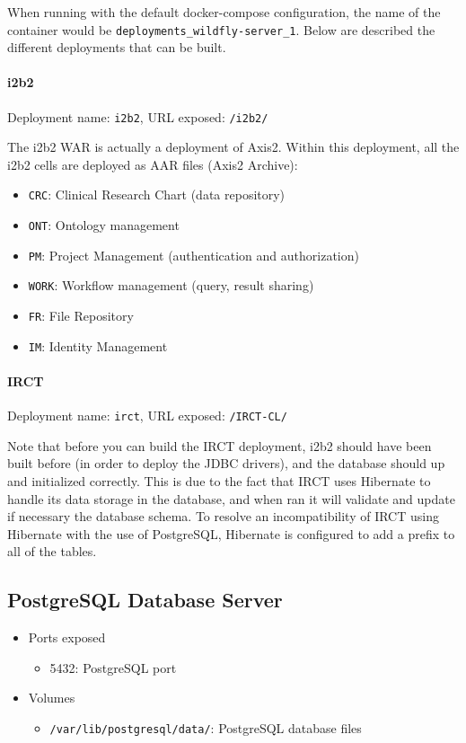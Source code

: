 When running with the default docker-compose configuration, the name of the container would be \verb|deployments_wildfly-server_1|.
Below are described the different deployments that can be built.

\paragraph{i2b2}
Deployment name: \verb|i2b2|, URL exposed: \verb|/i2b2/|

The i2b2 WAR is actually a deployment of Axis2. Within this deployment, all the i2b2 cells are deployed as AAR files (Axis2 Archive):

\begin{itemize}
    \item \verb|CRC|: Clinical Research Chart (data repository)
    \item \verb|ONT|: Ontology management
    \item \verb|PM|: Project Management (authentication and authorization)
    \item \verb|WORK|: Workflow management (query, result sharing)
    \item \verb|FR|: File Repository
    \item \verb|IM|: Identity Management
\end{itemize}

\paragraph{IRCT}
Deployment name: \verb|irct|, URL exposed: \verb|/IRCT-CL/|

Note that before you can build the IRCT deployment, i2b2 should have been built before (in order to deploy the JDBC drivers), and the database should up and initialized correctly.
This is due to the fact that IRCT uses Hibernate to handle its data storage in the database, and when ran it will validate and update if necessary the database schema.
To resolve an incompatibility of IRCT using Hibernate with the use of PostgreSQL, Hibernate is configured to add a prefix to all of the tables.


\subsection{PostgreSQL Database Server}

\begin{itemize}
    \item Ports exposed
        \begin{itemize}
        \item 5432: PostgreSQL port
        \end{itemize}
        
    \item Volumes
        \begin{itemize}
        \item \verb|/var/lib/postgresql/data/|: PostgreSQL database files
        \end{itemize}
\end{itemize}

